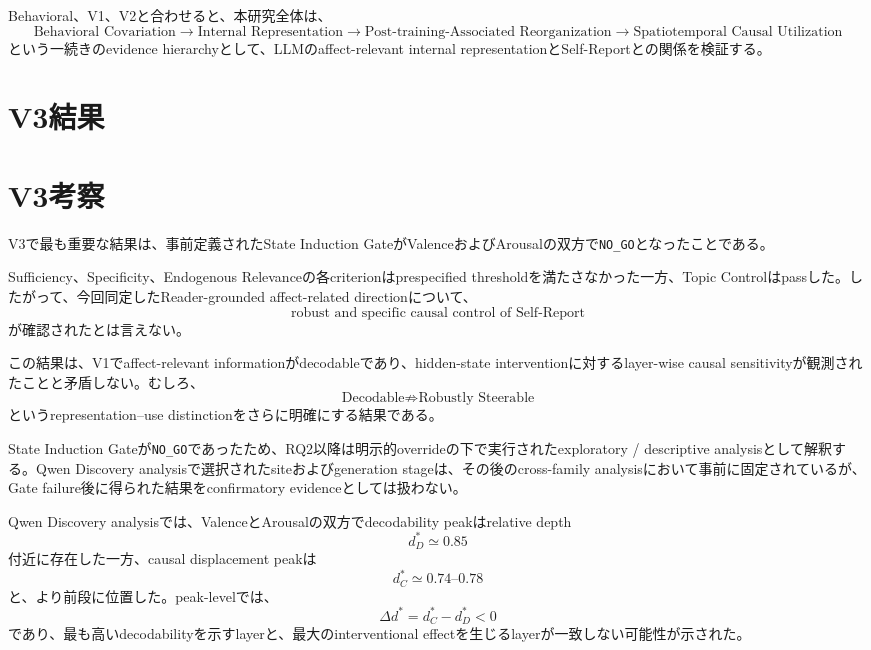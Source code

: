 \documentclass{article} %
\begin{document}
\begin{CJK*}{UTF8}{min}
Behavioral、V1、V2と合わせると、本研究全体は、
\[
\text{Behavioral Covariation}
\rightarrow
\text{Internal Representation}
\rightarrow
\text{Post-training-Associated Reorganization}
\rightarrow
\text{Spatiotemporal Causal Utilization}
\]
という一続きのevidence hierarchyとして、LLMのaffect-relevant internal representationとSelf-Reportとの関係を検証する。


\section{V3結果}
\label{sec:v3-results}




\section{V3考察}
\label{sec:v3-discussion}
V3で最も重要な結果は、事前定義されたState Induction GateがValenceおよびArousalの双方で\texttt{NO\_GO}となったことである。

Sufficiency、Specificity、Endogenous Relevanceの各criterionはprespecified thresholdを満たさなかった一方、Topic Controlはpassした。したがって、今回同定したReader-grounded affect-related directionについて、
\[
\text{robust and specific causal control of Self-Report}
\]
が確認されたとは言えない。

この結果は、V1でaffect-relevant informationがdecodableであり、hidden-state interventionに対するlayer-wise causal sensitivityが観測されたことと矛盾しない。むしろ、
\[
\text{Decodable}
\not\Rightarrow
\text{Robustly Steerable}
\]
というrepresentation--use distinctionをさらに明確にする結果である。

State Induction Gateが\texttt{NO\_GO}であったため、RQ2以降は明示的overrideの下で実行されたexploratory / descriptive analysisとして解釈する。Qwen Discovery analysisで選択されたsiteおよびgeneration stageは、その後のcross-family analysisにおいて事前に固定されているが、Gate failure後に得られた結果をconfirmatory evidenceとしては扱わない。

Qwen Discovery analysisでは、ValenceとArousalの双方でdecodability peakはrelative depth
\[
d_D^{*}\simeq0.85
\]
付近に存在した一方、causal displacement peakは
\[
d_C^{*}\simeq0.74\text{--}0.78
\]
と、より前段に位置した。peak-levelでは、
\[
\Delta d^{*}
=
d_C^{*}-d_D^{*}
<0
\]
であり、最も高いdecodabilityを示すlayerと、最大のinterventional effectを生じるlayerが一致しない可能性が示された。


\end{CJK*}
\end{document}
